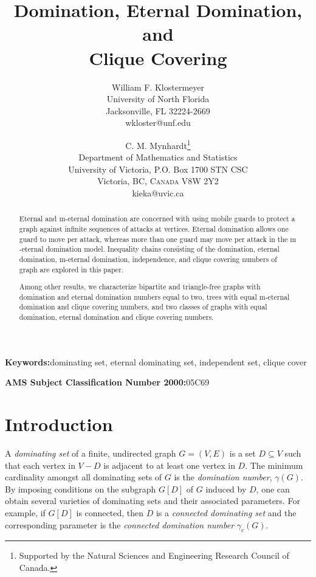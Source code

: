 \documentclass[12pt]{article}%
\begin{document}
\title{\textbf{Domination, Eternal Domination, and }\\\textbf{Clique Covering}}
\author{William F. Klostermeyer\\University of North Florida\\Jacksonville, FL 32224-2669\\{\small wkloster@unf.edu}
\and C. M. Mynhardt\thanks{Supported by the Natural Sciences and Engineering
Research Council of Canada.}\\Department of Mathematics and Statistics\\University of Victoria, P.O. Box 1700 STN CSC\\Victoria, BC, \textsc{Canada} V8W 2Y2\\{\small kieka@uvic.ca}}
\date{}
\maketitle

\begin{abstract}
Eternal and $\mathrm{m}$-eternal domination are concerned with using mobile
guards to protect a graph against infinite sequences of attacks at vertices.
Eternal domination allows one guard to move per attack, whereas more than one
guard may move per attack in the $\mathrm{m}$-eternal domination model.
Inequality chains consisting of the domination, eternal domination,
$\mathrm{m}$-eternal domination, independence, and clique covering numbers of
graph are explored in this paper.

Among other results, we characterize bipartite and triangle-free graphs with
domination and eternal domination numbers equal to two, trees with equal
$\mathrm{m}$-eternal domination and clique covering numbers, and two classes
of graphs with equal domination, eternal domination and clique covering numbers.

\end{abstract}

\noindent\textbf{Keywords:\hspace{0.1in}}dominating set, eternal dominating
set, independent set, clique cover

\noindent\textbf{AMS Subject Classification Number 2000:\hspace{0.1in}}05C69

\section{Introduction}

\label{Sec_Models}A \emph{dominating set }of a finite, undirected graph
$G=(V,E)$ is a set $D\subseteq V$ such that each vertex in $V-D$ is adjacent
to at least one vertex in $D$. The minimum cardinality amongst all dominating
sets of $G$ is the \emph{domination number}, $\gamma(G)$. By imposing
conditions on the subgraph $G[D]$ of $G$ induced by $D$, one can obtain
several varieties of dominating sets and their associated parameters. For
example, if $G[D]$ is connected, then $D$ is a \emph{connected dominating set
}and the corresponding parameter is the \emph{connected} \emph{domination
number} $\gamma_{c}(G)$.
\end{document}
